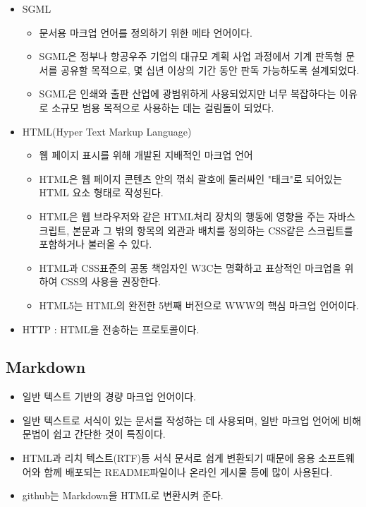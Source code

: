 \documentclass{article}
\begin{document}
\begin{itemize}
    \item SGML
    \begin{itemize}
        \item 문서용 마크업 언어를 정의하기 위한 메타 언어이다.
        \item SGML은 정부나 항공우주 기업의 대규모 계획 사업 과정에서 기계 판독형 문서를 공유할 목적으로, 몇 십년 이상의 기간 동안 판독 가능하도록 설계되었다.
        \item SGML은 인쇄와 출판 산업에 광범위하게 사용되었지만 너무 복잡하다는 이유로 소규모 범용 목적으로 사용하는 데는 걸림돌이 되었다.
    \end{itemize}
    \item HTML(Hyper Text Markup Language)
    \begin{itemize}
        \item 웹 페이지 표시를 위해 개발된 지배적인 마크업 언어
        \item HTML은 웹 페이지 콘텐츠 안의 꺾쇠 괄호에 둘러싸인 "태크"로 되어있는 HTML 요소 형태로 작성된다.
        \item HTML은 웹 브라우저와 같은 HTML처리 장치의 행동에 영향을 주는 자바스크립트, 본문과 그 밖의 항목의 외관과 배치를 정의하는 CSS같은 스크립트를 포함하거나 불러올 수 있다.
        \item HTML과 CSS표준의 공동 책임자인 W3C는 명확하고 표상적인 마크업을 위하여 CSS의 사용을 권장한다.
        \item HTML5는 HTML의 완전한 5번째 버전으로 WWW의 핵심 마크업 언어이다.
    \end{itemize}
    \item HTTP : HTML을 전송하는 프로토콜이다.
\end{itemize}
\subsection{Markdown}
\begin{itemize}
    \item 일반 텍스트 기반의 경량 마크업 언어이다.
    \item 일반 텍스트로 서식이 있는 문서를 작성하는 데 사용되며, 일반 마크업 언어에 비해 문법이 쉽고 간단한 것이 특징이다.
    \item HTML과 리치 텍스트(RTF)등 서식 문서로 쉽게 변환되기 때문에 응용 소프트웨어와 함께 배포되는 README파일이나 온라인 게시물 등에 많이 사용된다.
    \item github는 Markdown을 HTML로 변환시켜 준다.
\end{itemize}
\end{document}
